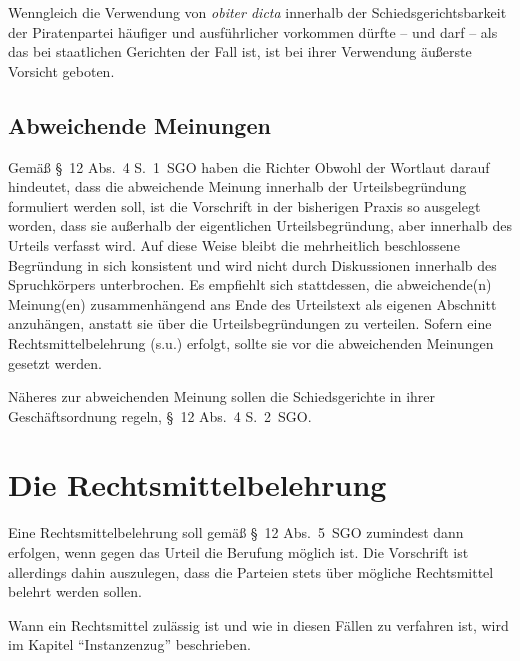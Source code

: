 Wenngleich die Verwendung von \emph{obiter dicta} innerhalb der Schiedsgerichtsbarkeit der Piratenpartei häufiger und ausführlicher vorkommen dürfte – und darf – als das bei staatlichen Gerichten der Fall ist, ist bei ihrer Verwendung äußerste Vorsicht geboten.

\subsection{Abweichende Meinungen}
Gemäß §~12 Abs.~4 S.~1~SGO haben die Richter  Obwohl der Wortlaut darauf hindeutet, dass die abweichende Meinung innerhalb der Urteilsbegründung formuliert werden soll, ist die Vorschrift in der bisherigen Praxis so ausgelegt worden, dass sie außerhalb der eigentlichen Urteilsbegründung, aber innerhalb des Urteils verfasst wird. Auf diese Weise bleibt die mehrheitlich beschlossene Begründung in sich konsistent und wird nicht durch Diskussionen innerhalb des Spruchkörpers unterbrochen. Es empfiehlt sich stattdessen, die abweichende(n) Meinung(en) zusammenhängend ans Ende des Urteilstext als eigenen Abschnitt anzuhängen, anstatt sie über die Urteilsbegründungen zu verteilen. Sofern eine Rechtsmittelbelehrung (s.u.) erfolgt, sollte sie vor die abweichenden Meinungen gesetzt werden.

Näheres zur abweichenden Meinung sollen die Schiedsgerichte in ihrer Geschäftsordnung regeln, §~12 Abs.~4 S.~2~SGO.

\section{Die Rechtsmittelbelehrung}
Eine Rechtsmittelbelehrung soll gemäß §~12 Abs.~5~SGO zumindest dann erfolgen, wenn gegen das Urteil die Berufung möglich ist. Die Vorschrift ist allerdings dahin auszulegen, dass die Parteien stets über mögliche Rechtsmittel belehrt werden sollen.

Wann ein Rechtsmittel zulässig ist und wie in diesen Fällen zu verfahren ist, wird im Kapitel \enquote{Instanzenzug} beschrieben.

